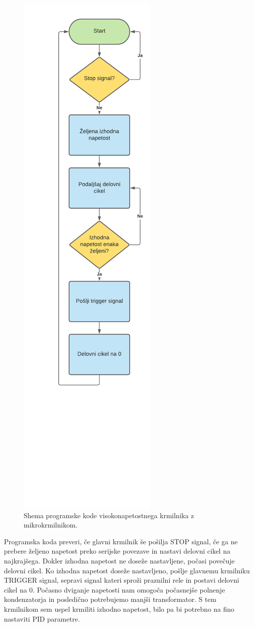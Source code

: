 \documentclass[a4paper,twoside,openright,12pt,Slovene]{book}
\begin{document}
	\begin{figure}[H]
    \centering
    \includegraphics[width=0.35\columnwidth]{Sheme/KrmilnikzuCShema.pdf}
    \caption{\label{KrmilnikzuCShema} Shema programske kode visokonapetostnega krmilnika z mikrokrmilnikom.}
	\end{figure}
	
Programska koda preveri, če glavni krmilnik še pošilja STOP signal, če ga ne prebere željeno napetost preko serijske povezave in nastavi delovni cikel na najkrajšega. Dokler izhodna napetost ne doseže nastavljene, počasi povečuje delovni cikel. Ko izhodna napetost doseže nastavljeno, pošlje glavnemu krmilniku TRIGGER signal, sepravi signal kateri sproži praznilni rele in postavi delovni cikel na 0. Počasno dviganje napetosti nam omogoča počasnejše polnenje kondenzatorja in posledično potrebujemo manjši transformator. S tem krmilnikom sem uspel krmiliti izhodno napetost, bilo pa bi potrebno na fino nastaviti PID parametre.
\end{document}
